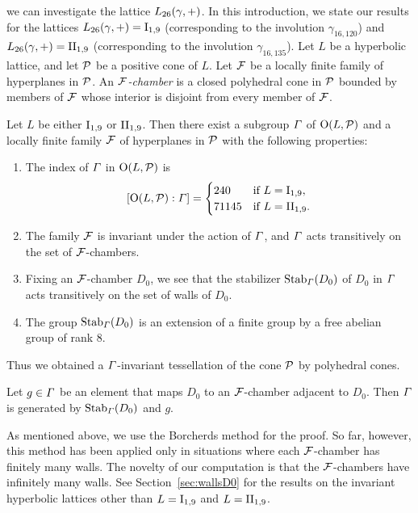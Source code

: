 \documentclass{amsart} %
\begin{document}
we can investigate %
the lattice $L_{26}(\gamma, +)$.
In this introduction, 
we state our results for the lattices $L_{26}(\gamma, +)=\mathrm{I}_{1,9}$ (corresponding to the involution $\gamma_{16,120}$) 
and $L_{26}(\gamma, +)=\mathrm{II}_{1,9}$ (corresponding to the involution $\gamma_{16,135}$).
Let $L$ be a hyperbolic lattice, 
and let $\mathord{\mathcal{P}}$ be a positive cone of $L$.
 Let $\mathord{\mathcal{F}}$ be a locally finite family of hyperplanes in $\mathord{\mathcal{P}}$. 
 An \emph{$\mathord{\mathcal{F}}$-chamber} is a closed polyhedral cone in $\mathord{\mathcal{P}}$ 
 bounded by members of $\mathord{\mathcal{F}}$ whose interior is disjoint from every member of $\mathord{\mathcal{F}}$.
%
%
\begin{theorem}\label{thm:main3}
Let $L$ be either $\mathrm{I}_{1,9}$ or $\mathrm{II}_{1,9}$. 
Then there exist a subgroup $\varGamma$ 
of $\mathord{\mathrm{O}}(L,\mathord{\mathcal{P}})$ and a locally finite family $\mathord{\mathcal{F}}$ of hyperplanes in $\mathord{\mathcal{P}}$
with the following properties:
\begin{enumerate}[label={\rm(\roman*)}]
%
\item
The index of $\varGamma$ in $\mathord{\mathrm{O}}(L,\mathord{\mathcal{P}})$ is 
\[
[\mathord{\mathrm{O}}(L,\mathord{\mathcal{P}}): \varGamma]=\begin{cases}
240 & \textrm{if $L=\mathrm{I}_{1,9}$}, \\
71145 & \textrm{if $L=\mathrm{II}_{1,9}$}. \\
\end{cases}
\]
\item The family $\mathord{\mathcal{F}}$ is invariant under the action of $\varGamma$, 
and $\varGamma$ acts transitively on the set of $\mathord{\mathcal{F}}$-chambers.
\item Fixing an $\mathord{\mathcal{F}}$-chamber $D_0$,
we see that the stabilizer $\operatorname{Stab}_{\varGamma}(D_0)$ of $D_0$ in $\varGamma$
 acts transitively on the set of walls of $D_0$.
 \item 
 The group 
 $\operatorname{Stab}_{\varGamma}(D_0)$ is an extension of a finite group by a free abelian group of rank $8$.
\end{enumerate}
\end{theorem}
%
Thus we obtained a $\varGamma$-invariant tessellation of the cone $\mathord{\mathcal{P}}$ by polyhedral cones.
%
\begin{corollary}\label{thm:CorOfmain3}
Let $g\in\varGamma$ be an element that maps $D_0$ to an $\mathord{\mathcal{F}}$-chamber adjacent to $D_0$. 
Then $\varGamma$ is generated by $\operatorname{Stab}_{\varGamma}(D_0)$ and $g$.
\end{corollary}
%
As mentioned above, we use the Borcherds method for the proof. 
So far, however,
 this method has been applied only in situations where each $\mathord{\mathcal{F}}$-chamber has finitely many walls. 
 The novelty of our computation is that 
 the $\mathord{\mathcal{F}}$-chambers have infinitely many walls. 
See Section~\ref{sec:wallsD0} for the results on the invariant hyperbolic lattices
other than $L=\mathrm{I}_{1,9}$ and $L=\mathrm{II}_{1,9}$.
%
\end{document}
